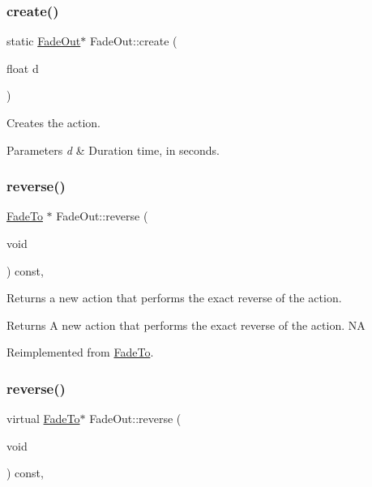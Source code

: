 \subsubsection{\texorpdfstring{create()}{create()}\hspace{0.1cm}{\footnotesize\ttfamily [2/2]}}
{\footnotesize\ttfamily static \hyperlink{classFadeOut}{Fade\+Out}$\ast$ Fade\+Out\+::create (\begin{DoxyParamCaption}\item[{float}]{d }\end{DoxyParamCaption})\hspace{0.3cm}{\ttfamily [static]}}

Creates the action. 
\begin{DoxyParams}{Parameters}
{\em d} & Duration time, in seconds. \\
\hline
\end{DoxyParams}
\mbox{\label{classFadeOut_aefa1585ac126946418ca92cb74b8a130}} 
\subsubsection{\texorpdfstring{reverse()}{reverse()}\hspace{0.1cm}{\footnotesize\ttfamily [1/2]}}
{\footnotesize\ttfamily \hyperlink{classFadeTo}{Fade\+To} $\ast$ Fade\+Out\+::reverse (\begin{DoxyParamCaption}\item[{void}]{ }\end{DoxyParamCaption}) const\hspace{0.3cm}{\ttfamily [override]}, {\ttfamily [virtual]}}

Returns a new action that performs the exact reverse of the action.

\begin{DoxyReturn}{Returns}
A new action that performs the exact reverse of the action.  NA 
\end{DoxyReturn}


Reimplemented from \hyperlink{classFadeTo_a40e463b17c90aa34c3ffe0c3dc016742}{Fade\+To}.

\mbox{\label{classFadeOut_a18e27b1b9737d0f99604d683a1e185a8}} 
\subsubsection{\texorpdfstring{reverse()}{reverse()}\hspace{0.1cm}{\footnotesize\ttfamily [2/2]}}
{\footnotesize\ttfamily virtual \hyperlink{classFadeTo}{Fade\+To}$\ast$ Fade\+Out\+::reverse (\begin{DoxyParamCaption}\item[{void}]{ }\end{DoxyParamCaption}) const\hspace{0.3cm}{\ttfamily [override]}, {\ttfamily [virtual]}}

